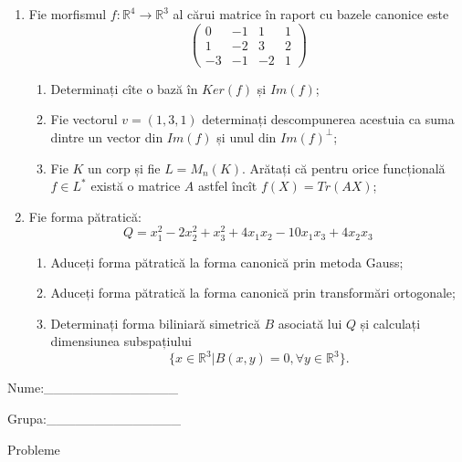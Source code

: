 \documentclass{article}
\begin{document}
\begin{enumerate}
 \item Fie morfismul $f:\mathbb{R}^4 \to \mathbb{R}^3$ al cărui matrice în raport cu bazele canonice este
$$\begin{pmatrix}
0&-1&1&1\\
1&-2&3&2\\
-3&-1&-2&1
\end{pmatrix}$$

\begin{enumerate}
\item Determinați cîte o bază în $Ker(f)$ și $Im(f)$;
\item Fie vectorul $v=(1,3,1)$ determinați descompunerea acestuia ca suma dintre un vector din $Im(f)$ și unul din $Im(f)^\perp$;
\item Fie $K$ un corp și fie $L=M_n(K)$. Arătați că pentru orice funcțională $f \in L^*$ există o matrice $A$ astfel încît $f(X)=Tr(AX)$;
\end{enumerate}
\item Fie forma pătratică:
$$Q= x_1^2-2x_2^2+x_3^2+4x_1x_2-10x_1x_3+4x_2x_3$$

\begin{enumerate}
\item Aduceți forma pătratică la forma canonică prin metoda Gauss;
\item Aduceți forma pătratică la forma canonică prin transformări ortogonale;
\item Determinați forma biliniară simetrică $B$ asociată lui $Q$ și calculați dimensiunea subspațiului
$$\{x \in \mathbb{R}^3 | B(x,y)=0,\forall y \in \mathbb{R}^3\}.$$

\end{enumerate}
\end{enumerate}
\newpage
\begin{flushright}
Nume:\_\_\_\_\_\_\_\_\_\_\_\_\_\_
 
 
Grupa:\_\_\_\_\_\_\_\_\_\_\_\_\_\_
\end{flushright}
\begin{center}
\vspace{2cm}
{\Large Probleme}
\vspace{2cm}
\end{center}
\end{document}
